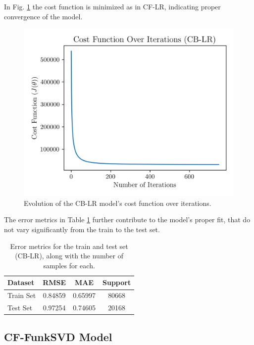 \documentclass[conference]{IEEEtran}
\begin{document}
In Fig. \ref{fig:model02_cost_function} the cost function is minimized as in CF-LR, indicating proper convergence of the model.

\begin{figure}[H]
    \centering
    \includegraphics[width=1\linewidth]{assets/model02_cost_function.png}
    \caption{Evolution of the CB-LR model's cost function over iterations.}
    \label{fig:model02_cost_function}
\end{figure}

The error metrics in Table \ref{tab:model03_results} further contribute to the model's proper fit, that do not vary significantly from the train to the test set.

\begin{table}[H]
\centering
\caption{Error metrics for the train and test set (CB-LR), along with the number of samples for each.}
\label{tab:model03_results}
\begin{tabular}{lccc}
\toprule
\textbf{Dataset} & \textbf{RMSE} & \textbf{MAE} & \textbf{Support} \\
\midrule
Train Set & 0.84859 & 0.65997 & 80668 \\
Test Set & 0.97254 & 0.74605 & 20168 \\
\bottomrule
\end{tabular}
\end{table}

\subsection{CF-FunkSVD Model}
\end{document}
